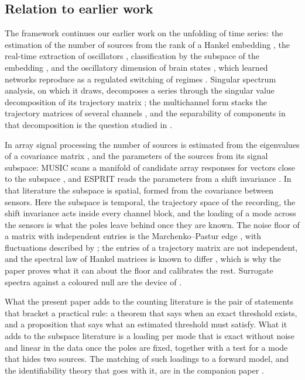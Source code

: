 \documentclass{article}
\begin{document}
\subsection{Relation to earlier work}\label{sec:relation-to-earlier-work}

The framework continues our earlier work on the unfolding of time series: the estimation of the number of sources from the rank of a Hankel embedding \cite{ref-BernadotteBuchstaber, ref-Bernadotte05}, the real-time extraction of oscillators \cite{ref-Bernadotte06}, classification by the subspace of the embedding \cite{ref-Bernadotte10}, and the oscillatory dimension of brain states \cite{ref-Bernadotte07}, which learned networks reproduce as a regulated switching of regimes \cite{ref-ACTBOID}. Singular spectrum analysis, on which it draws, decomposes a series through the singular value decomposition of its trajectory matrix \cite{ref-Broomhead, ref-Vautard, ref-Golyandina01, ref-Golyandina02}; the multichannel form stacks the trajectory matrices of several channels \cite{ref-Golyandina03, ref-Plaut}, and the separability of components in that decomposition is the question studied in \cite{ref-Golyandina04}.

In array signal processing the number of sources is estimated from the eigenvalues of a covariance matrix \cite{ref-Wax, ref-Kritchman}, and the parameters of the sources from its signal subspace: MUSIC scans a manifold of candidate array responses for vectors close to the subspace \cite{ref-Schmidt}, and ESPRIT reads the parameters from a shift invariance \cite{ref-Roy, ref-Hua}. In that literature the subspace is spatial, formed from the covariance between sensors. Here the subspace is temporal, the trajectory space of the recording, the shift invariance acts inside every channel block, and the loading of a mode across the sensors is what the poles leave behind once they are known. The noise floor of a matrix with independent entries is the Marchenko--Pastur edge \cite{ref-Marchenko, ref-Yin, ref-BaiYin}, with fluctuations described by \cite{ref-Johnstone}; the entries of a trajectory matrix are not independent, and the spectral law of Hankel matrices is known to differ \cite{ref-Bryc}, which is why the paper proves what it can about the floor and calibrates the rest. Surrogate spectra against a coloured null are the device of \cite{ref-Allen}.

What the present paper adds to the counting literature is the pair of statements that bracket a practical rule: a theorem that says when an exact threshold exists, and a proposition that says what an estimated threshold must satisfy. What it adds to the subspace literature is a loading per mode that is exact without noise and linear in the data once the poles are fixed, together with a test for a mode that hides two sources. The matching of such loadings to a forward model, and the identifiability theory that goes with it, are in the companion paper \cite{ref-companion}.
\end{document}
